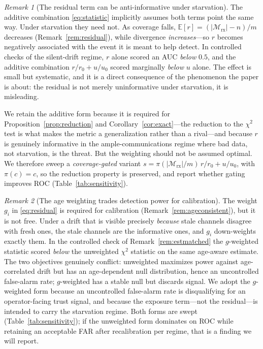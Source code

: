 \documentclass[journal]{IEEEtran}
\theoremstyle{plain}
\theoremstyle{definition}
\theoremstyle{remark}
\newtheorem{remark}{Remark}
\newcommand{\Mrx}{\mathcal{M}_{\mathrm{rx}}}
\begin{document}
\begin{remark}[The residual term can be anti-informative under starvation]
\label{rem:antiinformative}
The additive combination \eqref{eq:statistic} implicitly assumes both
terms point the same way. Under starvation they need not. As coverage
falls, $\mathbb{E}[r]=(|\Mrx|-n)/m$ decreases (Remark~\ref{rem:residual}),
while divergence \emph{increases}---so $r$ becomes negatively associated
with the event it is meant to help detect. In controlled checks of the
silent-drift regime, $r$ alone scored an AUC \emph{below} $0.5$, and the
additive combination $r/r_0+u/u_0$ scored marginally \emph{below} $u$
alone. The effect is small but systematic, and it is a direct consequence
of the phenomenon the paper is about: the residual is not merely
uninformative under starvation, it is misleading.

We retain the additive form because it is required for
Proposition~\ref{prop:reduction} and Corollary~\ref{cor:exact}---the
reduction to the $\chi^{2}$ test is what makes the metric a
generalization rather than a rival---and because $r$ is genuinely
informative in the ample-communications regime where bad data, not
starvation, is the threat. But the weighting should not be assumed
optimal. We therefore sweep a \emph{coverage-gated} variant
$s=\pi(|\Mrx|/m)\,r/r_0+u/u_0$, with $\pi(c)=c$,
so the reduction property is preserved, and report whether gating
improves ROC (Table~\ref{tab:sensitivity}).
\end{remark}

\begin{remark}[The age weighting trades detection power for calibration]
\label{rem:powertension}
The weight $g_i$ in \eqref{eq:residual} is required for calibration
(Remark~\ref{rem:ageconsistent}), but it is not free. Under a drift that
is visible precisely \emph{because} stale channels disagree with fresh
ones, the stale channels are the informative ones, and $g_i$ down-weights
exactly them. In the controlled check of Remark~\ref{rem:estmatched} the
$g$-weighted statistic scored \emph{below} the unweighted $\chi^{2}$
statistic on the same age-aware estimate. The two objectives genuinely
conflict: unweighted maximizes power against age-correlated drift but has
an age-dependent null distribution, hence an uncontrolled false-alarm
rate; $g$-weighted has a stable null but discards signal. We adopt the
$g$-weighted form because an uncontrolled false-alarm rate is
disqualifying for an operator-facing trust signal, and because the
exposure term---not the residual---is intended to carry the starvation
regime. Both forms are swept
(Table~\ref{tab:sensitivity}); if the unweighted form dominates on ROC
while retaining an acceptable FAR after recalibration per regime, that is
a finding we will report.
\end{remark}
\end{document}
